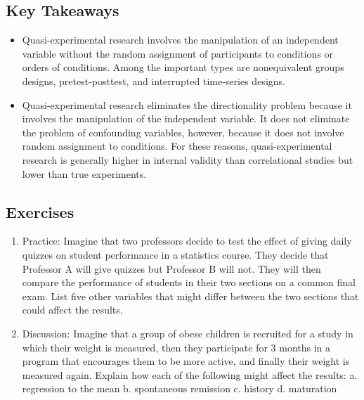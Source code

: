 \subsection{Key Takeaways}

\begin{fullwidth}

\begin{itemize}


\item Quasi-experimental research involves the manipulation of an independent variable without the random assignment of participants to conditions or orders of conditions. Among the important types are nonequivalent groups designs, pretest-posttest, and interrupted time-series designs.

\item Quasi-experimental research eliminates the directionality problem because it involves the manipulation of the independent variable. It does not eliminate the problem of confounding variables, however, because it does not involve random assignment to conditions. For these reasons, quasi-experimental research is generally higher in internal validity than correlational studies but lower than true experiments.


\end{itemize}

\end{fullwidth}



\subsection{Exercises}

\begin{fullwidth}

\begin{enumerate}

\item  Practice: Imagine that two professors decide to test the effect of giving daily quizzes on student performance in a statistics course. They decide that Professor A will give quizzes but Professor B will not. They will then compare the performance of students in their two sections on a common final exam. List five other variables that might differ between the two sections that could affect the results.

\item Discussion: Imagine that a group of obese children is recruited for a study in which their weight is measured, then they participate for 3 months in a program that encourages them to be more active, and finally their weight is measured again. Explain how each of the following might affect the results:
a. regression to the mean b. spontaneous remission c. history
d. maturation


\end{enumerate}

\end{fullwidth}


